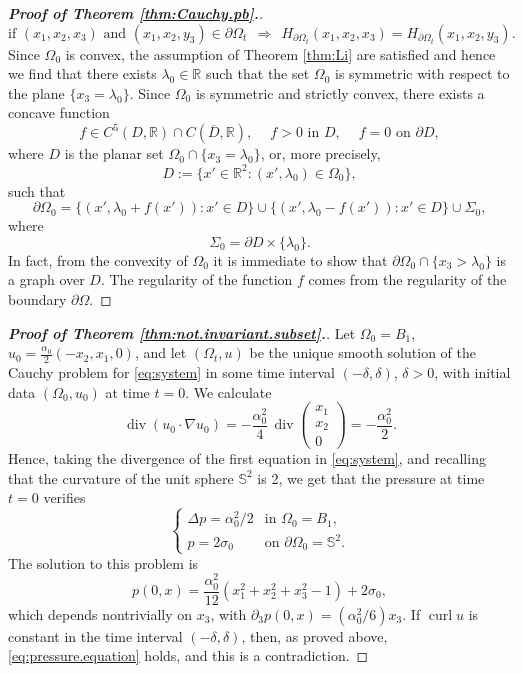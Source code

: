 \documentclass[10pt,reqno,a4paper]{article}
\numberwithin{equation}{section}
\theoremstyle{plain}
\theoremstyle{definition}
\newcommand{\R}{{\mathbb R}}
\renewcommand{\S}{{\mathbb S}}
\renewcommand{\a}{\alpha}
\newcommand{\lm}{\lambda}
\newcommand{\Om}{\Omega}
\newcommand{\s}{\sigma}
\newcommand{\pa}{\partial}
\renewcommand{\div}{\operatorname{div}} %
\newcommand{\grad}{\nabla}
\newcommand{\curl}{\operatorname{curl}}
\begin{document}
\begin{proof}[\textbf{Proof of Theorem \ref{thm:Cauchy.pb}.}]
\begin{equation}\label{eq:curvature.symmetric}
\text{if } (x_1,x_2,x_3) \text{ and } (x_1,x_2, y_3) \in \pa \Omega_t 
\ \ \Longrightarrow \ \ 
H_{\pa \Omega_t}(x_1,x_2,x_3)= H_{\pa \Omega_t} (x_1,x_2,y_3).
\end{equation}
Since $\Omega_0$ is convex, the assumption of Theorem \ref{thm:Li} are satisfied 
and hence we find that there exists $\lambda_0 \in \R$ such that 
the set $\Omega_0$
is symmetric with respect to the plane $\{x_3=\lambda_0\}$.
Since $\Omega_0$ is symmetric and strictly convex, 
there exists a concave function 
\[
f \in C^5(D,\R) \cap C(\overline{D},\R), \quad \ 
f > 0 \text{ in } D, \quad \ 
f=0 \text{ on } \pa D, 
\] 
where $D$ is the planar set $\Om_0 \cap \{ x_3 = \lm_0 \}$, or, more precisely, 
\[
D := \{ x' \in \R^2 : (x',\lm_0) \in \Omega_0 \},
\] 
such that
\[
\pa \Omega_0 
= \{(x', \lambda_0 +f(x')) : x' \in D\} 
\cup  \{(x', \lambda_0 -f(x')) : x' \in D\}
\cup \Sigma_0,
\]
where
\[
\Sigma_0= \pa D \times\{\lambda_0\}.
\]
In fact, from the convexity of $\Om_0$ it is immediate to show that 
$\pa \Omega_0 \cap \{x_3>\lambda_0\}$ is a graph over $D$.  
The regularity of the function $f$ comes from the regularity of the boundary $\pa \Omega$.
\end{proof}

\begin{proof}[\textbf{Proof of Theorem \ref{thm:not.invariant.subset}.}]
Let $\Omega_0 = B_1$, $u_0 = \frac{\alpha_0}{2} (-x_2, x_1, 0)$, 
and let $(\Om_t, u)$ be the unique smooth solution of the Cauchy problem for \eqref{eq:system} 
in some time interval $(-\delta, \delta)$, $\delta > 0$, 
with initial data $(\Omega_0, u_0)$ at time $t=0$. 
We calculate 
\begin{equation*}
\div (u_0\cdot\grad u_0) 
= - \frac{\a_0^2}{4} \, \div \!\! \begin{pmatrix}x_1 \\ x_2 \\ 0 \end{pmatrix}
= - \frac{\a_0^2}{2}.
\end{equation*}
Hence, taking the divergence of the first equation in \eqref{eq:system}, 
and recalling that the curvature of the unit sphere $\S^2$ is 2,   
we get that the pressure at time $t=0$ verifies 
\[
\begin{cases}
\Delta p = \a_0^2/2  
& \text{in } \Om_0 = B_1,
\\
p = 2 \s_0  
& \text{on } \pa \Om_0 = \S^2. 
\end{cases}
\]
The solution to this problem is 
\begin{equation*}
p(0,x) = \frac{\a_0^2}{12}(x_1^2 + x_2^2 + x_3^2 - 1) + 2\s_0,
\end{equation*}
which depends nontrivially on $x_3$, 
with $\pa_3 p(0,x) = (\a_0^2 / 6) x_3$.  
If $\curl u$ is constant in the time interval $(-\delta, \delta)$, 
then, as proved above, \eqref{eq:pressure.equation} holds, and this is a contradiction. 
\end{proof}
\end{document}
